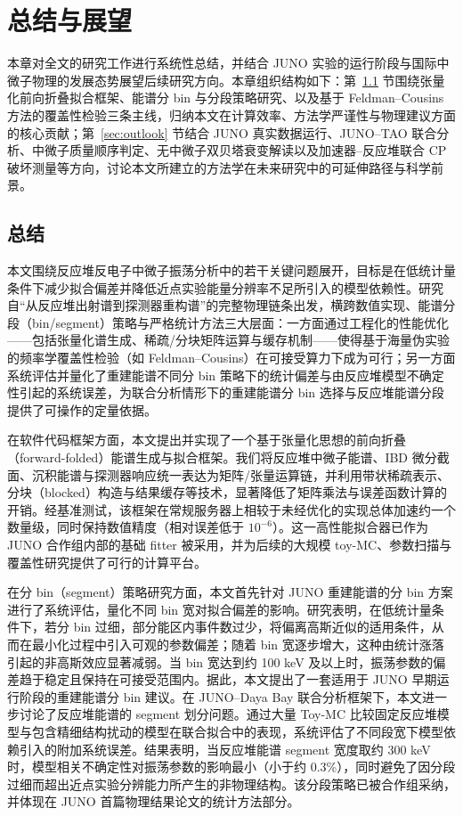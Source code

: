 \chapter{总结与展望}
本章对全文的研究工作进行系统性总结，并结合 JUNO 实验的运行阶段与国际中微子物理的发展态势展望后续研究方向。本章组织结构如下：第~\ref{sec:final_summary} 节围绕张量化前向折叠拟合框架、能谱分 bin 与分段策略研究、以及基于 Feldman--Cousins 方法的覆盖性检验三条主线，归纳本文在计算效率、方法学严谨性与物理建议方面的核心贡献；第~\ref{sec:outlook} 节结合 JUNO 真实数据运行、JUNO--TAO 联合分析、中微子质量顺序判定、无中微子双贝塔衰变解读以及加速器--反应堆联合 CP 破坏测量等方向，讨论本文所建立的方法学在未来研究中的可延伸路径与科学前景。

\section{总结}
\label{sec:final_summary}
本文围绕反应堆反电子中微子振荡分析中的若干关键问题展开，目标是在低统计量条件下减少拟合偏差并降低近点实验能量分辨率不足所引入的模型依赖性。研究自“从反应堆出射谱到探测器重构谱”的完整物理链条出发，横跨数值实现、能谱分段（bin/segment）策略与严格统计方法三大层面：一方面通过工程化的性能优化——包括张量化谱生成、稀疏/分块矩阵运算与缓存机制——使得基于海量伪实验的频率学覆盖性检验（如 Feldman–Cousins）在可接受算力下成为可行；另一方面系统评估并量化了重建能谱不同分 bin 策略下的统计偏差与由反应堆模型不确定性引起的系统误差，为联合分析情形下的重建能谱分 bin 选择与反应堆能谱分段提供了可操作的定量依据。

在软件代码框架方面，本文提出并实现了一个基于张量化思想的前向折叠（forward-folded）能谱生成与拟合框架。我们将反应堆中微子能谱、IBD 微分截面、沉积能谱与探测器响应统一表达为矩阵/张量运算链，并利用带状稀疏表示、分块（blocked）构造与结果缓存等技术，显著降低了矩阵乘法与误差函数计算的开销。经基准测试，该框架在常规服务器上相较于未经优化的实现总体加速约一个数量级，同时保持数值精度（相对误差低于 $10^{-6}$）。这一高性能拟合器已作为 JUNO 合作组内部的基础 fitter 被采用，并为后续的大规模 toy-MC、参数扫描与覆盖性研究提供了可行的计算平台。

在分 bin（segment）策略研究方面，本文首先针对 JUNO 重建能谱的分 bin 方案进行了系统评估，量化不同 bin 宽对拟合偏差的影响。研究表明，在低统计量条件下，若分 bin 过细，部分能区内事件数过少，将偏离高斯近似的适用条件，从而在最小化过程中引入可观的参数偏差；随着 bin 宽逐步增大，这种由统计涨落引起的非高斯效应显著减弱。当 bin 宽达到约 100 keV 及以上时，振荡参数的偏差趋于稳定且保持在可接受范围内。据此，本文提出了一套适用于 JUNO 早期运行阶段的重建能谱分 bin 建议。在 JUNO–Daya Bay 联合分析框架下，本文进一步讨论了反应堆能谱的 segment 划分问题。通过大量 Toy-MC 比较固定反应堆模型与包含精细结构扰动的模型在联合拟合中的表现，系统评估了不同段宽下模型依赖引入的附加系统误差。结果表明，当反应堆能谱 segment 宽度取约 300 keV 时，模型相关不确定性对振荡参数的影响最小（小于约 0.3\%），同时避免了因分段过细而超出近点实验分辨能力所产生的非物理结构。该分段策略已被合作组采纳，并体现在 JUNO 首篇物理结果论文的统计方法部分。

